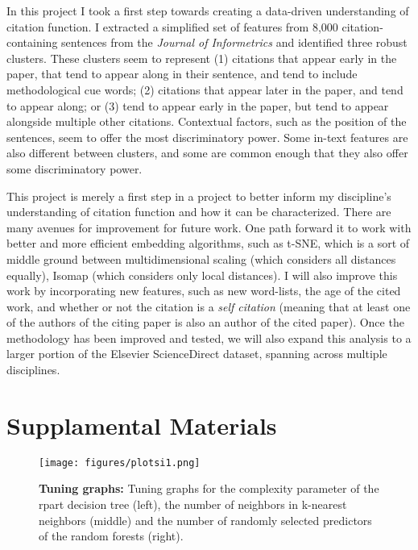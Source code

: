 \documentclass[
10pt, %
a4paper, %
oneside, %
headinclude,footinclude, %
BCOR5mm, %
]{scrartcl}
\begin{document}
In this project I took a first step towards creating a data-driven understanding of citation function. I extracted a simplified set of features from 8,000 citation-containing sentences from the \textit{Journal of Informetrics} and identified three robust clusters. These clusters seem to represent (1) citations that appear early in the paper, that tend to appear along in their sentence, and tend to include methodological cue words; (2) citations that appear later in the paper, and tend to appear along; or (3) tend to appear early in the paper, but tend to appear alongside multiple other citations. Contextual factors, such as the position of the sentences, seem to offer the most discriminatory power. Some in-text features are also different between clusters, and some are common enough that they also offer some discriminatory power. 

This project is merely a first step in a project to better inform my discipline's understanding of citation function and how it can be characterized. There are many avenues for improvement for future work. One path forward it to work with better and more efficient embedding algorithms, such as t-SNE, which is a sort of middle ground between multidimensional scaling (which considers all distances equally), Isomap (which considers only local distances). I will also improve this work by incorporating new features, such as new word-lists, the age of the cited work, and whether or not the citation is a \textit{self citation} (meaning that at least one of the authors of the citing paper is also an author of the cited paper). Once the methodology has been improved and tested, we will also expand this analysis to a larger portion of the Elsevier ScienceDirect dataset, spanning across multiple disciplines. 

\newpage
\section{Supplamental Materials}

\begin{figure}[h]
	\centering
	\texttt{[image: figures/plotsi1.png]}
	\caption{\textbf{Tuning graphs:} Tuning graphs for the complexity parameter of the rpart decision tree (left), the number of neighbors in k-nearest neighbors (middle) and the number of randomly selected predictors of the random forests (right). }
	\label{fig:tuning_params}
\end{figure}
\end{document}
